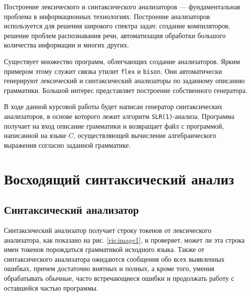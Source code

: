 \documentclass[bachelor, och, coursework, times]{SCWorks}
\begin{document}


\tableofcontents





\intro
Построение лексического и синтаксического анализаторов --- фундаментальная проблема в информационных технологиях. Построение анализаторов используется для решения широкого спектра задач: создание компиляторов, решение проблем распознавания речи, автоматизация обработки большого количества информации и многих других.

Существует множество программ, облегчающих создание анализаторов. Ярким примером этому служит связка утилит \verb|flex| и \verb|bison|. Они автоматически генерируют лексический и синтаксический анализаторы по заданному описанию грамматики. Большой интерес представляет построение собственного генератора.

В ходе данной курсовой работы будет написан генератор синтаксических анализаторов, в основе которого лежит алгоритм \verb|SLR(1)|-анализа. Программа получает на вход описание грамматики и возвращает файл с программой, написанной на языке $C$, осуществляющей вычисление алгебраического выражения согласно заданной грамматике.




\section{Восходящий синтаксический анализ}
\subsection{Синтаксический анализатор}
Синтаксический анализатор получает строку токенов от лексического анализатора, как показано на рис. \ref{ris:image1}, и проверяет, может ли эта строка имен токенов порождаться грамматикой исходного языка. Также от синтаксического анализатора ожидаются сообщения обо всех выявленных ошибках, причем достаточно внятных и полных, а кроме того, умения обрабатывать обычные, часто встречающиеся ошибки и продолжать работу с оставшейся частью программы. 
\end{document}
